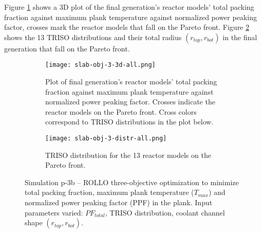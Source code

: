 Figure \ref{fig:slab-obj-3-3d-all} shows a 3D plot of the final generation's reactor 
models' total packing fraction against maximum plank temperature against normalized
power peaking factor, crosses mark the reactor models that fall on the Pareto front.
Figure \ref{fig:slab-obj-3-distr-all} shows the 13 TRISO distributions and their
total radius $(r_{top}, r_{bot})$ in the final generation that fall on the Pareto 
front. 
\begin{figure}[htbp!]
    \begin{subfigure}{\textwidth}
        \centering
        \texttt{[image: slab-obj-3-3d-all.png]}
        \caption{Plot of final generation's reactor models' total packing fraction against maximum plank 
        temperature against normalized power peaking factor. Crosses indicate the reactor models on the 
        Pareto front. Cross colors correspond to TRISO distributions in the plot below.}
        \label{fig:slab-obj-3-3d-all} 
    \end{subfigure}
    \begin{subfigure}{\textwidth}
        \texttt{[image: slab-obj-3-distr-all.png]}
        \caption{TRISO distribution for the 13 reactor models on the Pareto front.}
        \label{fig:slab-obj-3-distr-all} 
    \end{subfigure}
    \caption{Simulation p-3b -- ROLLO three-objective optimization to minimize total packing fraction, 
    maximum plank temperature ($T_{max}$) and normalized power peaking factor (PPF) in the plank. 
    Input parameters varied: $PF_{total}$, TRISO distribution, 
    coolant channel shape $(r_{top}, r_{bot})$.}
    \label{fig:slab-obj-3-all}
\end{figure}


